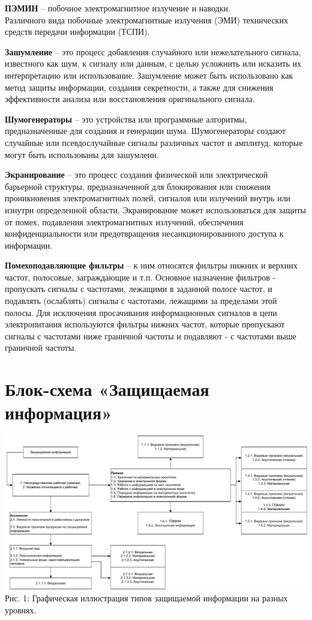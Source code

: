 \documentclass[utf8,14pt,a4paper,oneside,russian]{book}
\begin{document}
\textbf{ПЭМИН} – побочное электромагнитное излучение и наводки.\\ Различного вида побочные
электромагнитные излучения (ЭМИ) технических средств передачи информации (ТСПИ).

\textbf{Зашумление} – это процесс добавления случайного или нежелательного сигнала, известного как шум, к сигналу или данным,
с целью усложнить или исказить их интерпретацию или использование. Зашумление может быть использовано как метод защиты информации,
создания секретности, а также для снижения эффективности анализа или восстановления оригинального сигнала.

\textbf{Шумогенераторы} – это устройства или программные алгоритмы,\\ предназначенные для создания и генерации шума.
Шумогенераторы создают случайные или псевдослучайные сигналы различных частот и амплитуд, которые могут
быть использованы для зашумлени.

\textbf{Экранирование} – это процесс создания физической или электрической барьерной структуры, предназначенной для блокирования или снижения проникновения электромагнитных
полей, сигналов или излучений внутрь или изнутри определенной области. Экранирование может использоваться для защиты от помех, подавления электромагнитных излучений,
обеспечения конфиденциальности или предотвращения несанкционированного доступа к информации.

\textbf{Помехоподавляющие фильтры} – к ним относятся фильтры нижних и верхних частот, полосовые, заграждающие и т.п. Основное назначение фильтров -
пропускать сигналы с частотами, лежащими в заданной полосе частот, и подавлять (ослаблять) сигналы с частотами,
лежащими за пределами этой полосы. Для исключения просачивания информационных сигналов в цепи электропитания используются
фильтры нижних частот, которые пропускают сигналы с частотами ниже граничной частоты и подавляют - с частотами выше граничной частоты.

\newpage
\section{Блок-схема «Защищаемая информация»}

\begin{center}
  \includegraphics[scale=0.6, angle=-90]{block}\\
  Рис. 1: Графическая иллюстрация типов защищаемой информации на разных уровнях.\\
\end{center}
\end{document}

